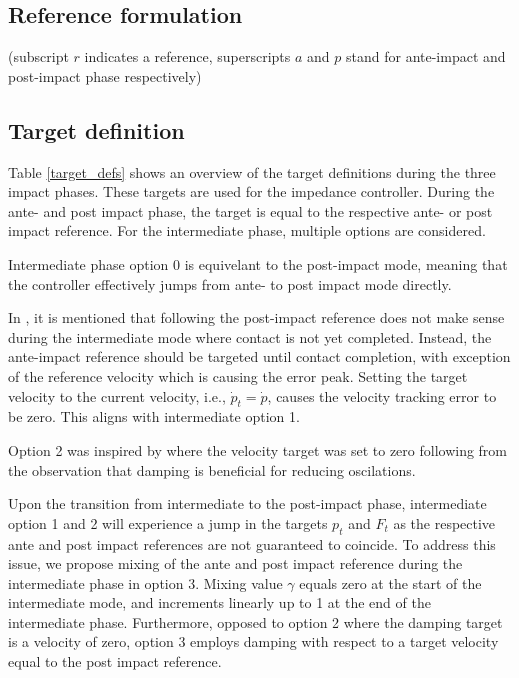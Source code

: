 \documentclass[a4paper, 10pt, conference]{ieeeconf}
\begin{document}
    \subsection{Reference formulation}
    (subscript $r$ indicates a reference, superscripts $a$ and $p$ stand for ante-impact and post-impact phase respectively)
    \subsection{Target definition}
    Table \ref{target_defs} shows an overview of the target definitions during the three impact phases. These targets are used for the impedance controller. During the ante- and post impact phase, the target is equal to the respective ante- or post impact reference. For the intermediate phase, multiple options are considered.

    Intermediate phase option 0 is equivelant to the post-impact mode, meaning that the controller effectively jumps from ante- to post impact mode directly.

    In \cite{vansteenRobotControlSimultaneous2021}, it is mentioned that following the post-impact reference does not make sense during the intermediate mode where contact is not yet completed. Instead, the ante-impact reference should be targeted until contact completion, with exception of the reference velocity which is causing the error peak. Setting the target velocity to the current velocity, i.e., $\dot{p}_t=\dot{p}$, causes the velocity tracking error to be zero. This aligns with intermediate option 1.

    Option 2 was inspired by \cite{uitendaalTeachingRobotsInteraction2022} where the velocity target was set to zero following from the observation that damping is beneficial for reducing oscilations. 

    Upon the transition from intermediate to the post-impact phase, intermediate option 1 and 2 will experience a jump in the targets $p_t$ and $F_t$ as the respective ante and post impact references are not guaranteed to coincide. To address this issue, we propose mixing of the ante and post impact reference during the intermediate phase in option 3. Mixing value $\gamma$ equals zero at the start of the intermediate mode, and increments linearly up to 1 at the end of the intermediate phase. Furthermore, opposed to option 2 where the damping target is a velocity of zero, option 3 employs damping with respect to a target velocity equal to the post impact reference.
\end{document}
